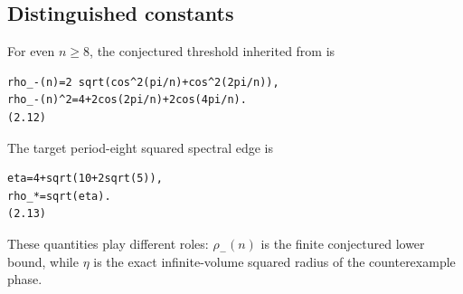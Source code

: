 \subsection{Distinguished constants}

For even \(n\ge 8\), the conjectured threshold inherited from \cite{Suvagiya2026Signed} is

\begin{lstlisting}[language={}]
rho_-(n)=2 sqrt(cos^2(pi/n)+cos^2(2pi/n)),
rho_-(n)^2=4+2cos(2pi/n)+2cos(4pi/n).                            (2.12)
\end{lstlisting}

The target period-eight squared spectral edge is

\begin{lstlisting}[language={}]
eta=4+sqrt(10+2sqrt(5)),
rho_*=sqrt(eta).                                                  (2.13)
\end{lstlisting}

These quantities play different roles: \(\rho_-(n)\) is the finite conjectured
lower bound, while \(\eta\) is the exact infinite-volume squared radius of the
counterexample phase.

